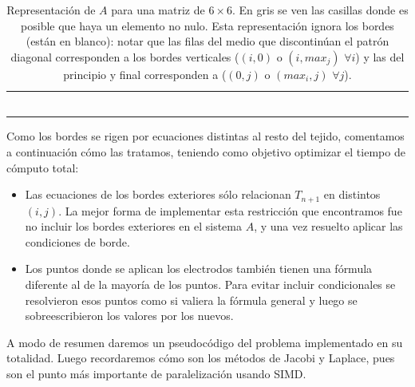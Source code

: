 \documentclass[a4paper]{article}
\begin{document}
\begin{table}[!htbp]
\begin{tabular}{|l|l|l|l|l|l|l|l|l|l|l|l|l|l|l|l|l|l|l|l|l|l|l|l|l|l|l|l|l|l|l|l|l|l|l|l|}
 & & & & & & & & & & & & & & & & & & & & & & & & & & & & & & & & & & & \\ \hline 
 & & & & & & & & & & & & & & & & & & & & & & & & & & & & & & & & & & & \\ \hline 
 & & & & & & & & & & & & & & & & & & & & & & & & & & & & & & & & & & & \\ \hline 
 & & & & & & & & & & & & & & & & & & & & & & & & & & & & & & & & & & & \\ \hline 
 & & & & & & & & & & & & & & & & & & & & & & & & & & & & & & & & & & & \\ \hline 
 & & & & & & & & & & & & & & & & & & & & & & & & & & & & & & & & & & & \\ \hline 
 & & & & & & & & & & & & & & & & & & & & & & & & & & & & & & & & & & & \\ \hline
\end{tabular}
\caption{Representación de $A$ para una matriz de $6\times6$. En gris se ven las casillas donde es posible que haya un elemento no nulo. Esta representación ignora los bordes (están en blanco): notar que las filas del medio que discontinúan el patrón diagonal corresponden a los bordes verticales ($(i,0)$ o $(i,max_j)$ $\forall i$) y las del principio y final corresponden a ($(0,j)$ o $(max_i,j)$ $\forall j$). }
\label{table:matriz_a}
\end{table}

Como los bordes se rigen por ecuaciones distintas al resto del tejido, comentamos a continuación
cómo las tratamos, teniendo como objetivo optimizar el tiempo de cómputo total:
\begin{itemize}
\item Las ecuaciones de los bordes exteriores sólo
relacionan $T_{n+1}$ en distintos $(i,j)$. La mejor forma de implementar esta
restricción que encontramos fue no incluir los bordes exteriores en el sistema $A$, y una vez
resuelto aplicar las condiciones de borde.
\item Los puntos donde se aplican los electrodos también tienen una 
fórmula diferente al de la mayoría de los puntos. Para evitar incluir 
condicionales se resolvieron esos puntos como si valiera la fórmula general
y luego se sobreescribieron los valores por los nuevos.
\end{itemize}

A modo de resumen daremos un pseudocódigo del problema implementado en 
su totalidad. Luego recordaremos cómo son los métodos de Jacobi y 
Laplace, pues son el punto más importante de paralelización usando SIMD.\\
\end{document}
